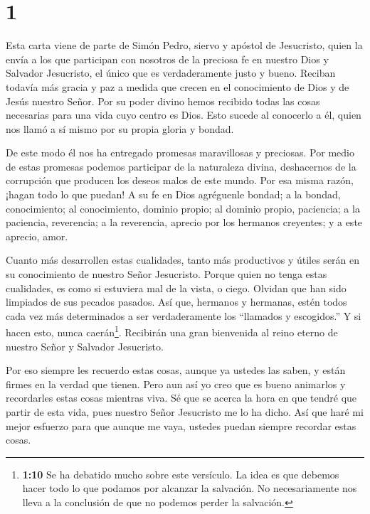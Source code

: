 \hypertarget{section}{%
\section{1}\label{section}}

 Esta carta viene de parte de Simón Pedro, siervo y apóstol
de Jesucristo, quien la envía a los que participan con nosotros de la
preciosa fe en nuestro Dios y Salvador Jesucristo, el único que es
verdaderamente justo y bueno.  Reciban todavía más gracia y
paz a medida que crecen en el conocimiento de Dios y de Jesús nuestro
Señor.  Por su poder divino hemos recibido todas las cosas
necesarias para una vida cuyo centro es Dios. Esto sucede al conocerlo a
él, quien nos llamó a sí mismo por su propia gloria y bondad.

De este modo él nos ha entregado promesas maravillosas y preciosas.
 Por medio de estas promesas podemos participar de la
naturaleza divina, deshacernos de la corrupción que producen los deseos
malos de este mundo.  Por esa misma razón, ¡hagan todo lo
que puedan! A su fe en Dios agréguenle bondad; a la bondad,
conocimiento;  al conocimiento, dominio propio; al dominio
propio, paciencia; a la paciencia, reverencia;  a la
reverencia, aprecio por los hermanos creyentes; y a este aprecio, amor.

 Cuanto más desarrollen estas cualidades, tanto más
productivos y útiles serán en su conocimiento de nuestro Señor
Jesucristo.  Porque quien no tenga estas cualidades, es como
si estuviera mal de la vista, o ciego. Olvidan que han sido limpiados de
sus pecados pasados.  Así que, hermanos y hermanas, estén
todos cada vez más determinados a ser verdaderamente los ``llamados y
escogidos.'' Y si hacen esto, nunca caerán\footnote{\textbf{1:10} Se ha
  debatido mucho sobre este versículo. La idea es que debemos hacer todo
  lo que podamos por alcanzar la salvación. No necesariamente nos lleva
  a la conclusión de que no podemos perder la salvación.}. 
Recibirán una gran bienvenida al reino eterno de nuestro Señor y
Salvador Jesucristo.

 Por eso siempre les recuerdo estas cosas, aunque ya
ustedes las saben, y están firmes en la verdad que tienen. 
Pero aun así yo creo que es bueno animarlos y recordarles estas cosas
mientras viva.  Sé que se acerca la hora en que tendré que
partir de esta vida, pues nuestro Señor Jesucristo me lo ha dicho.
 Así que haré mi mejor esfuerzo para que aunque me vaya,
ustedes puedan siempre recordar estas cosas.

